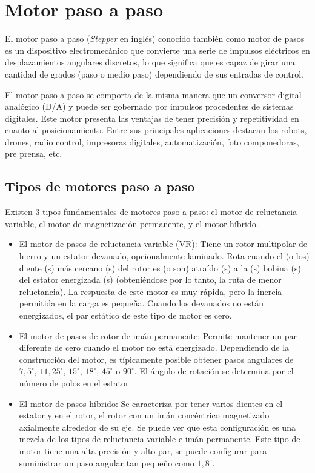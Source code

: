 \documentclass[../main]{subfiles}
\begin{document}
\chapter{Motor paso a paso}
\normalsize
El motor paso a paso (\emph{Stepper} en inglés) conocido también como motor de pasos es un dispositivo electromecánico que convierte una serie de impulsos eléctricos en desplazamientos angulares discretos, lo que significa que es capaz de girar una cantidad de grados (paso o medio paso) dependiendo de sus entradas de control.


El motor paso a paso se comporta de la misma manera que un conversor digital-analógico (D/A) y puede ser gobernado por impulsos procedentes de sistemas digitales. Este motor presenta las ventajas de tener precisión y repetitividad en cuanto al posicionamiento. Entre sus principales aplicaciones destacan los robots, drones, radio control, impresoras digitales, automatización, foto componedoras, pre prensa, etc.


\section{Tipos de motores paso a paso}
Existen 3 tipos fundamentales de motores paso a paso: el motor de reluctancia variable, el motor de magnetización permanente, y el motor híbrido.
\begin{itemize}
  \item El motor de pasos de reluctancia variable (VR): Tiene un rotor multipolar de hierro y un estator devanado, opcionalmente laminado. Rota cuando el (o los) diente (s) más cercano (s) del rotor es (o son) atraído (s) a la (s) bobina (s) del estator energizada (s) (obteniéndose por lo tanto, la ruta de menor reluctancia). La respuesta de este motor es muy rápida, pero la inercia permitida en la carga es pequeña. Cuando los devanados no están energizados, el par estático de este tipo de motor es cero.
  \item El motor de pasos de rotor de imán permanente: Permite mantener un par diferente de cero cuando el motor no está energizado. Dependiendo de la construcción del motor, es típicamente posible obtener pasos angulares de $7,5^\circ$, $11,25^\circ$, $15^\circ$, $18^\circ$, $45^\circ$ o $90^\circ$. El ángulo de rotación se determina por el número de polos en el estator.
  \item El motor de pasos híbrido: Se caracteriza por tener varios dientes en el estator y en el rotor, el rotor con un imán concéntrico magnetizado axialmente alrededor de su eje. Se puede ver que esta configuración es una mezcla de los tipos de reluctancia variable e imán permanente. Este tipo de motor tiene una alta precisión y alto par, se puede configurar para suministrar un paso angular tan pequeño como $1,8^\circ$.
\end{itemize}
\end{document}
